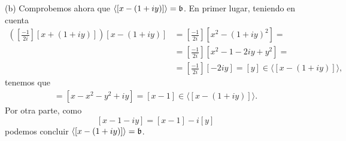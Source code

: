 \documentclass[../main.tex]{subfiles}
\begin{document}
%

(b) Comprobemos ahora que $\langle[x-(1+iy)]\rangle=\mathfrak{b}$. En primer lugar, teniendo en cuenta 
\begin{align*}
    \left(\left[\frac{-1}{2i}\right][x+(1+iy)]\right)[x-(1+iy)]&=\left[\frac{-1}{2i}\right][x^2-(1+iy)^2]=\\
    &=\left[\frac{-1}{2i}\right][x^2-1-2iy+y^2]=\\
    &=\left[\frac{-1}{2i}\right][-2iy]=[y]\in\langle [x-(1+iy)]\rangle,
\end{align*}
tenemos que
\begin{align*}
    [-x-iy][x-1-iy]=[x-x^2-y^2+iy]=[x-1]\in\langle [x-(1+iy)]\rangle.
\end{align*}
Por otra parte, como 
$$[x-1-iy]=[x-1]-i[y]$$
podemos concluir $\langle[x-(1+iy)]\rangle=\mathfrak{b}$.
\end{document}
